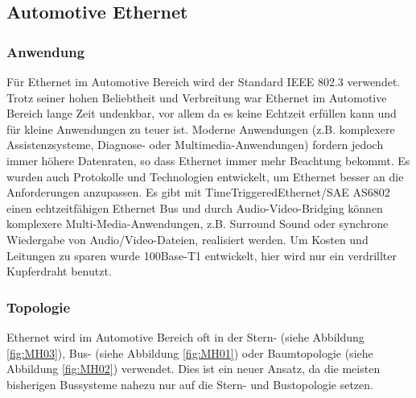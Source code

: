    \graphicspath{{./Images/Kapitel4/}}
    
    \subsection{Automotive Ethernet}
    \subsubsection{Anwendung}
    Für Ethernet im Automotive Bereich wird der Standard IEEE 802.3 verwendet. Trotz seiner hohen Beliebtheit und 
    Verbreitung war Ethernet im Automotive Bereich lange Zeit undenkbar, vor allem da es keine
     Echtzeit erfüllen kann und für kleine Anwendungen zu teuer ist. Moderne Anwendungen (z.B. komplexere Assistenzsysteme, Diagnose- oder Multimedia-Anwendungen) fordern jedoch immer höhere Datenraten, so dass Ethernet immer mehr Beachtung bekommt. Es wurden auch Protokolle und Technologien entwickelt, um Ethernet besser an die Anforderungen anzupassen. Es gibt mit TimeTriggeredEthernet/SAE AS6802 einen echtzeitfähigen Ethernet Bus und durch Audio-Video-Bridging können komplexere Multi-Media-Anwendungen, z.B. Surround Sound oder synchrone Wiedergabe von Audio/Video-Dateien, realisiert werden. Um Kosten und Leitungen zu sparen wurde 100Base-T1 entwickelt, hier wird nur ein verdrillter Kupferdraht benutzt. \cite{.MH_Ethernet}
    
    \subsubsection{Topologie}
    Ethernet wird im Automotive Bereich oft in der Stern- (siehe Abbildung \ref{fig:MH03}), Bus- (siehe Abbildung \ref{fig:MH01}) oder Baumtopologie (siehe Abbildung \ref{fig:MH02}) verwendet. Dies ist ein neuer Ansatz, da die meisten bisherigen Bussysteme nahezu nur auf die Stern- und Bustopologie setzen.
    \cite{.MH_Vehicle}
    
